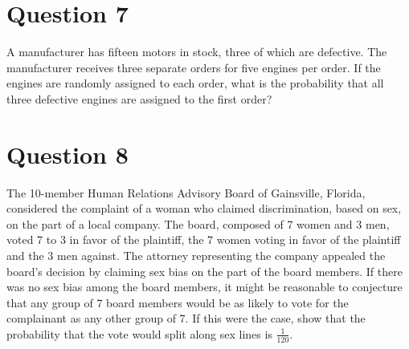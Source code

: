 \documentclass[11pt]{article}
\theoremstyle{definition}
\begin{document}
\section*{Question 7}

A manufacturer has fifteen motors in stock, three of which are defective. The manufacturer receives three separate orders for five engines per order. If the engines are randomly assigned to each order, what is the probability that all three defective engines are assigned to the first order?

\section*{Question 8}

The 10-member Human Relations Advisory Board of Gainsville, Florida, considered the complaint of a woman who claimed discrimination, based on sex, on the part of a local company. The board, composed of 7 women and 3 men, voted 7 to 3 in favor of the plaintiff, the 7 women voting in favor of the plaintiff and the 3 men against. The attorney representing the company appealed the board's decision by claiming sex bias on the part of the board members. If there was no sex bias among the board members, it might be reasonable to conjecture that any group of 7 board members would be as likely to vote for the complainant as any other group of 7. If this were the case, show that the probability that the vote would split along sex lines is $\frac{1}{120}$.
\end{document}
